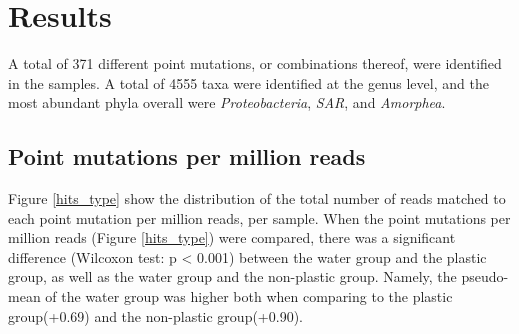 \chapter{Results}

A total of 371 different point mutations, or combinations thereof, were identified in the samples. 
A total of 4555 taxa were identified at the genus level, and the most abundant phyla overall were \emph{Proteobacteria}, \emph{SAR}, and \emph{Amorphea}. 



\section{Point mutations per million reads}
Figure \ref{hits_type} show the distribution of the total number of reads matched to each point mutation per million reads, per sample. 
When the point mutations per million reads (Figure \ref{hits_type}) were compared, there was a significant difference (Wilcoxon test: p < 0.001) between the water group and the plastic group, as well as the water group and the non-plastic group. Namely, the pseudo-mean of the water group was higher both when comparing to the plastic group(+0.69) and the non-plastic group(+0.90).

